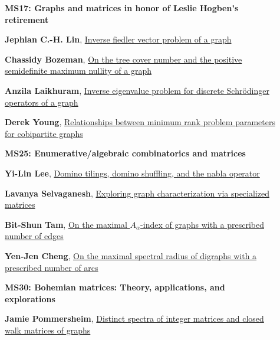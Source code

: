 \documentclass[ILAS2025-program.tex]{subfiles}
\begin{document}
\begin{description}
    \begin{description}
    \item[] {\color{mstitle}\textbf{MS17: Graphs and matrices in honor of Leslie Hogben's retirement}} 
    \item[] \hypertarget{up0221}{}\textbf{Jephian C.-H. Lin}, \hyperlink{down0221}{Inverse fiedler vector problem of a graph
}
        \item[] \hypertarget{up0222}{}\textbf{Chassidy Bozeman}, \hyperlink{down0222}{On the tree cover number and the positive semidefinite maximum nullity of a graph}
        \item[] \hypertarget{up0223}{}\textbf{Anzila Laikhuram}, \hyperlink{down0223}{Inverse eigenvalue problem for discrete Schrödinger operators of a graph}
        \item[] \hypertarget{up0224}{}\textbf{Derek Young}, \hyperlink{down0224}{Relationships between minimum rank problem parameters for cobipartite graphs}
        \end{description}
    \begin{description}
    \item[] {\color{mstitle}\textbf{MS25: Enumerative/algebraic combinatorics and matrices}} 
    \item[] \hypertarget{up0225}{}\textbf{Yi-Lin Lee}, \hyperlink{down0225}{Domino tilings, domino shuffling, and the nabla operator}
        \item[] \hypertarget{up0226}{}\textbf{Lavanya Selvaganesh}, \hyperlink{down0226}{Exploring graph characterization via specialized matrices
}
        \item[] \hypertarget{up0227}{}\textbf{Bit-Shun Tam}, \hyperlink{down0227}{On the maximal $A_\alpha$-index of graphs with a prescribed number of edges}
        \item[] \hypertarget{up0228}{}\textbf{Yen-Jen Cheng}, \hyperlink{down0228}{On the maximal spectral radius of digraphs with a prescribed number of arcs
}
        \end{description}
    \begin{description}
    \item[] {\color{mstitle}\textbf{MS30: Bohemian matrices: Theory, applications, and explorations}} 
    \item[] \hypertarget{up0229}{}\textbf{Jamie Pommersheim}, \hyperlink{down0229}{Distinct spectra of integer matrices and closed walk matrices of graphs}

\end{description}
\end{description}
\end{document}
